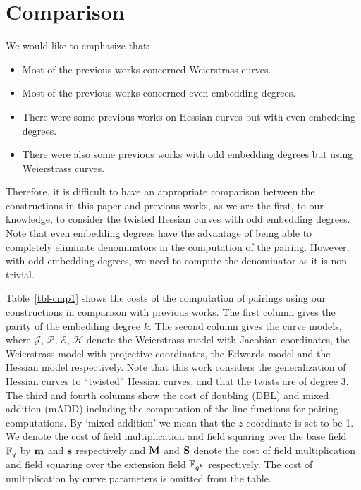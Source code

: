\section{Comparison}
\label{sec:cmp}

We would like to emphasize that:
\begin{itemize}
\item	Most of the previous works concerned Weierstrass curves.
\item	Most of the previous works concerned even embedding degrees.
\item	There were some previous works on Hessian curves but with even embedding degrees.
\item	There were also some previous works with odd embedding degrees but using Weierstrass curves.
\end{itemize}
Therefore, it is difficult to have an appropriate comparison between the constructions in this paper and previous works,
as we are the first, to our knowledge, to consider the twisted Hessian curves with odd embedding degrees.
Note that even embedding degrees have the advantage of being able to completely eliminate denominators in the computation of the pairing.
However, with odd embedding degrees, we need to compute the denominator as it is non-trivial.

Table~\ref{tbl-cmp1} shows the costs of the computation of pairings using our constructions in comparison with previous works.
The first column gives the parity of the embedding degree $k$.
The second column gives the curve models, where 
$\mathcal{J}$, $\mathcal{P}$, $\mathcal{E}$, $\mathcal{H}$ denote the
Weierstrass model with Jacobian coordinates, the
Weierstrass model with projective coordinates,
the Edwards model and the
Hessian model respectively.
Note that this work considers the generalization of Hessian curves to ``twisted'' Hessian curves, and that the twists are of degree 3.
The third and fourth columns show the cost of doubling (DBL) and mixed addition (mADD) including the computation of the line functions for pairing computations.
By `mixed addition' we mean that the $z$ coordinate is set to be 1.
We denote the cost of field multiplication and field squaring over the base field $\mathbb{F}_{q}$ by $\textbf{m}$ and $\textbf{s}$ respectively and $\textbf{M}$ and $\textbf{S}$ denote the cost of field multiplication and field squaring over the extension field $\mathbb{F}_{q^k}$ respectively.
The cost of multiplication by curve parameters is omitted from the table.


